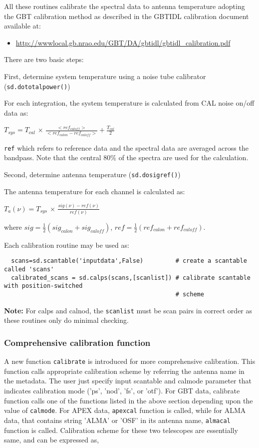 All these routines calibrate the spectral data to antenna temperature
adopting the GBT calibration method as described in the
GBTIDL calibration document available at: 
\begin{itemize}
   \item \url{http://wwwlocal.gb.nrao.edu/GBT/DA/gbtidl/gbtidl_calibration.pdf}
\end{itemize}
There are two basic steps:

First, determine system temperature using a noise tube calibrator
({\tt sd.dototalpower()}) 

For each integration, the system temperature is calculated from
CAL noise on/off data as:

$ T_{sys} = T_{cal}$ $\times$ 
$\frac{<ref_{caloff}>}{<ref_{calon} - ref_{caloff}>} + \frac{T_{cal}}{2} $

{\tt ref} which refers to reference data and the spectral data are averaged
across the bandpass.  Note that the central 80\% of the spectra are
used for the calculation.

Second, determine antenna temperature ({\tt sd.dosigref()})

The antenna temperature for each channel is calculated as:

$ T_a(\nu) = T_{sys}$ $\times$ 
$\frac{sig(\nu) - ref(\nu)}{ref(\nu)}$

where $sig = \frac{1}{2}(sig_{calon} + sig_{caloff})$, 
      $ref = \frac{1}{2}(ref_{calon} + ref_{caloff}).$


Each calibration routine may be used as:


\small
\begin{verbatim}
  scans=sd.scantable('inputdata',False)         # create a scantable called 'scans'
  calibrated_scans = sd.calps(scans,[scanlist]) # calibrate scantable with position-switched 
                                                # scheme
\end{verbatim}
\normalsize


{\bf Note:} For calps and calnod, the {\tt scanlist} must be scan pairs in
correct order as these routines only do minimal checking.

\subsubsection{Comprehensive calibration function}
A new function {\tt calibrate} is introduced for more comprehensive
calibration. This function calls appropriate calibration scheme by
referring the antenna name in the metadata. The user just specify input
scantable and calmode parameter that indicates calibration mode ('ps',
'nod', 'fs', or 'otf'). For GBT data, calibrate function calls one of
the functions listed in the above section depending upon the value of
{\tt calmode}. For APEX data, {\tt apexcal} function is called, while for ALMA
data, that contains string 'ALMA' or 'OSF' in its antenna name, {\tt almacal}
function is called. Calibration scheme for these two telescopes are
essentially same, and can be expressed as,

